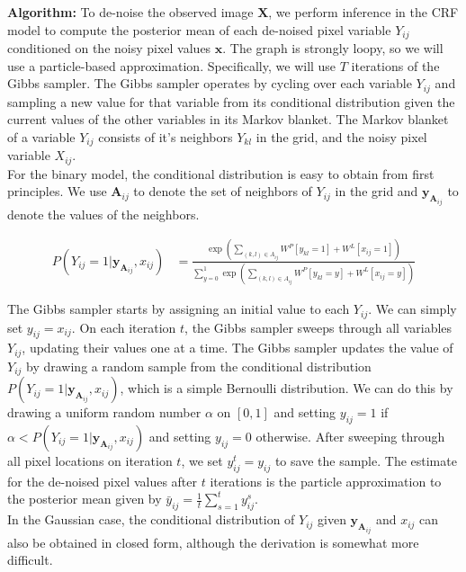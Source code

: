 \documentclass[11pt]{article}
\newcommand{\mbf}[1]{{\mathbf{#1}}}
\begin{document}
\textbf{Algorithm:} To de-noise the observed image $\mbf{X}$, we perform inference in the CRF model to compute the posterior mean of each de-noised pixel variable $Y_{ij}$ conditioned on the noisy pixel values $\mbf{x}$. The graph is strongly loopy, so we will use a particle-based approximation. Specifically, we will use $T$ iterations of the Gibbs sampler. The Gibbs sampler operates by cycling over each variable $Y_{ij}$ and sampling a new value for that variable from its conditional distribution given the current values of the other variables in its Markov blanket. The Markov blanket of a variable $Y_{ij}$ consists of it's neighbors $Y_{kl}$ in the grid, and the noisy pixel variable $X_{ij}$.\\

For the binary model, the conditional distribution is easy to obtain from first principles. We use $\mbf{A}_{ij}$ to denote the set of neighbors of $Y_{ij}$ in the grid and $\mbf{y}_{\mbf{A}_{ij}}$ to denote the values of the neighbors.

\begin{align}
P(Y_{ij}=1|\mbf{y}_{\mbf{A}_{ij}},x_{ij}) &= \frac{\displaystyle \exp\left(
\sum_{(k,l)\in A_{ij}} W^P[y_{kl}=1] + W^L[x_{ij}=1] \right)}
{\displaystyle \sum_{y=0}^1\exp\left(
\sum_{(k,l)\in A_{ij}} W^P[y_{kl}=y] + W^L[x_{ij}=y] \right)}
\end{align}

The Gibbs sampler starts by assigning an initial value to each $Y_{ij}$. We can simply set $y_{ij}=x_{ij}$. On each iteration $t$, the Gibbs sampler sweeps through all variables $Y_{ij}$, updating their values one at a time. The Gibbs sampler updates the value of $Y_{ij}$ by drawing a random sample from the conditional distribution $P(Y_{ij}=1|\mbf{y}_{\mbf{A}_{ij}},x_{ij})$, which is a simple Bernoulli distribution. We can do this by drawing a uniform random number $\alpha$ on $[0,1]$ and setting  $y_{ij}=1$ if $\alpha < P(Y_{ij}=1|\mbf{y}_{\mbf{A}_{ij}},x_{ij})$ and setting $y_{ij}=0$ otherwise. After sweeping through all pixel locations on iteration $t$,  we set $y^t_{ij}=y_{ij}$ to save the sample. The estimate for the de-noised pixel values after $t$ iterations is the particle approximation to the posterior mean given by $\bar{y}_{ij} = \frac{1}{t}\sum_{s=1}^ty^s_{ij}$.
\\

In the Gaussian case, the conditional distribution of $Y_{ij}$ given $\mbf{y}_{\mbf{A}_{ij}}$ and $x_{ij}$ can also be obtained in closed form, although the derivation is somewhat more difficult.
\end{document}
